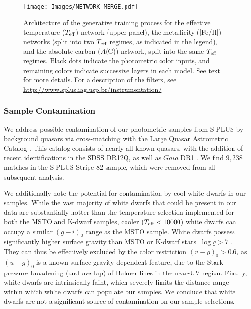 \documentclass[twocolumn,trackchanges]{aastex63}
\begin{document}
\begin{figure*}
	\centering
	\texttt{[image: Images/NETWORK\_MERGE.pdf]}
	
	\caption{Architecture of the generative training process for the effective temperature ($T_{\rm eff}$) network (upper panel), the metallicity ([Fe/H]) networks (split into two $T_{\rm eff}$ regimes, as indicated in the legend), and the absolute carbon ($A$(C)) network, split into the same $T_{\rm eff}$ regimes. Black dots indicate the photometric color inputs, and remaining colors indicate successive layers in each model. See text for more details.
	For a description of the filters, see 
	\href{http://www.splus.iag.usp.br/instrumentation/ } {http://www.splus.iag.usp.br/instrumentation/ } \label{fig:NETWORK_DIAGRAMS}}
\end{figure*}

\subsubsection{Sample Contamination}

We address possible contamination of our photometric samples from S-PLUS by background quasars via  cross-matching with the Large Quasar Astrometric Catalog \citep{Gattano:2018}. This catalog consists of nearly all known quasars, with the addition of recent identifications in the SDSS DR12Q, as well as $Gaia$ DR1 \citep{Gaia:DR1}. We find $9,238$ matches in the S-PLUS Stripe 82 sample, which were removed from all subsequent analysis.

We additionally note the potential for contamination by cool white dwarfs in our samples. While the vast majority of white dwarfs that could be present in our data are substantially hotter than the temperature selection implemented for both the MSTO and K-dwarf samples, cooler ($T_{\rm eff} < 10000$) white dwarfs can occupy a similar $(g-i)_0$ range as the MSTO sample. White dwarfs possess significantly higher surface gravity than MSTO or K-dwarf stars, $\log{g}>7$ \citep{Eisenstein:2006}. They can thus be effectively excluded by the color restriction $(u-g)_0 > 0.6$, as $(u-g)_0$ is a known surface-gravity dependent feature, due to the Stark pressure broadening (and overlap) of Balmer lines in the near-UV region. Finally, white dwarfs are intrinsically faint, which severely limits the distance range within which white dwarfs can populate our samples. We conclude that white dwarfs are not a significant source of contamination on our sample selections.
\end{document}
